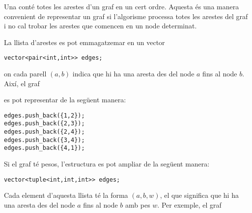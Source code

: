 
Una  conté totes les arestes d'un graf en un
cert ordre. Aquesta és una manera convenient de representar un graf si
l'algorisme processa totes les arestes del graf i no cal trobar les
arestes que comencen en un node determinat.

La llista d'arestes es pot emmagatzemar en un vector
\begin{lstlisting}
vector<pair<int,int>> edges;
\end{lstlisting}
on cada parell $(a,b)$ indica que hi ha una aresta des del node $a$
fins al node $b$. Així, el graf


\begin{center}
\end{center}
es pot representar de la següent manera:
\begin{lstlisting}
edges.push_back({1,2});
edges.push_back({2,3});
edges.push_back({2,4});
edges.push_back({3,4});
edges.push_back({4,1});
\end{lstlisting}


\noindent Si el graf té pesos, l'estructura es pot ampliar de la següent manera:
\begin{lstlisting}
vector<tuple<int,int,int>> edges;
\end{lstlisting}
Cada element d'aquesta llista té la forma $(a,b,w)$, el que significa que hi ha una aresta des del node $a$ fins al node $b$ amb pes $w$. Per exemple, el graf


\begin{center}
\end{center}

